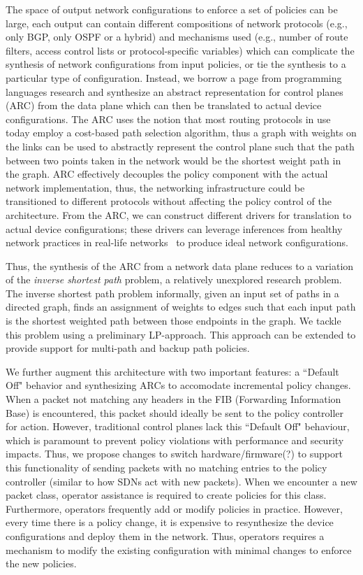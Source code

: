 The space of output network configurations to enforce a set of policies
can be large, each output can contain different compositions of 
network protocols (e.g., only BGP, only OSPF or a hybrid) and
mechanisms used (e.g., number of route filters, access control lists
or protocol-specific variables) which can complicate the synthesis of
network configurations from
input policies, or tie the synthesis to a particular type of configuration. 
Instead, we borrow a page from programming languages
research and
synthesize an abstract representation for control planes (ARC) from 
the data plane which can then be translated to actual device configurations.
The ARC uses the notion that most routing protocols in use 
today employ a cost-based path selection algorithm, thus a graph with
weights on the links can be used to abstractly represent the control plane such that 
the path between two points taken in the network would be 
the shortest weight path in the graph. 
ARC effectively decouples the policy component with the 
actual network implementation, thus, the networking infrastructure could be
transitioned to different protocols without affecting the policy 
control of the architecture. From the ARC, we can construct different
drivers for translation to actual device configurations; these drivers
can leverage inferences from healthy network practices in 
real-life networks~\cite{mpa-imc15} to produce ideal network configurations.

Thus, the synthesis of the ARC from a network data plane reduces to a
variation of the {\em inverse shortest path} problem, a relatively 
unexplored research problem. The inverse shortest path problem informally,
given an input set of paths in a directed graph, 
finds an assignment of weights to edges such that each input
path is the shortest weighted path between those endpoints in 
the graph. We tackle this problem using a preliminary 
LP-approach. This approach can be extended to provide support
for multi-path and backup path policies. 


We further augment this architecture with two important features: 
a ``Default Off" behavior and synthesizing ARCs to
accomodate incremental policy changes. When a packet not matching any headers
in the FIB (Forwarding Information Base) is encountered, this packet 
should ideally be sent to the 
policy controller for action. However, traditional control planes lack this
``Default Off" behaviour, which is paramount to prevent policy violations with
performance and security impacts. Thus, we propose changes to switch hardware/firmware(?) 
to support this functionality of sending packets with no matching entries to the 
policy controller (similar to how SDNs act with new packets).
When we encounter a new packet class, operator assistance is required to create policies 
for this class. Furthermore, operators frequently add or modify policies in practice. 
However, every time there is a policy change, it is expensive to resynthesize the device
configurations and deploy them in the network. Thus, 
operators requires a mechanism to modify the 
existing configuration with minimal changes to enforce the new policies.


